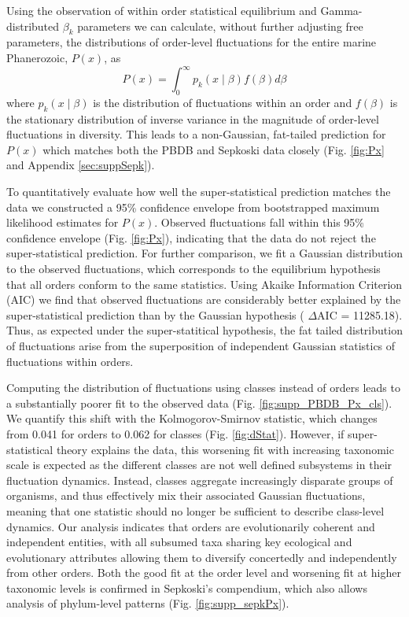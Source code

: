 \documentclass[12pt]{article}
\begin{document}
Using the observation of within order statistical equilibrium and
Gamma-distributed $\beta_k$ parameters we can calculate, without
further adjusting free parameters, the distributions of order-level
fluctuations for the entire marine Phanerozoic, $P(x)$, as
\begin{equation}
  P(x) = \int_0^\infty p_k(x \mid \beta) f(\beta) d\beta \label{eq:PxInt}
\end{equation}
where $p_k(x \mid \beta)$ is the distribution of fluctuations within
an order and $f(\beta)$ is the stationary distribution of inverse
variance in the magnitude of order-level fluctuations in
diversity. This leads to a non-Gaussian, fat-tailed prediction for
$P(x)$ which matches both the PBDB and Sepkoski data closely
(Fig. \ref{fig:Px} and Appendix \ref{sec:suppSepk}).

To quantitatively evaluate how well the super-statistical prediction
matches the data we constructed a 95\% confidence envelope from
bootstrapped maximum likelihood estimates for $P(x)$. Observed
fluctuations fall within this 95\% confidence envelope
(Fig. \ref{fig:Px}), indicating that the data do not reject the
super-statistical prediction. For further comparison, we fit a
Gaussian distribution to the observed fluctuations, which corresponds
to the equilibrium hypothesis that all orders conform to the same
statistics. Using Akaike Information Criterion (AIC) we find that
observed fluctuations are considerably better explained by the
super-statistical prediction than by the Gaussian hypothesis ({\small
  $\Delta$}AIC = 11285.18). Thus, as expected under the
super-statitical hypothesis, the fat tailed distribution of
fluctuations arise from the superposition of independent Gaussian
statistics of fluctuations within orders.

Computing the distribution of fluctuations using classes instead of
orders leads to a substantially poorer fit to the observed data
(Fig. \ref{fig:supp_PBDB_Px_cls}). We quantify this shift with the
Kolmogorov-Smirnov statistic, which changes from 0.041 for orders to
0.062 for classes (Fig. \ref{fig:dStat}). However, if super-statistical
theory explains the data, this worsening fit with increasing taxonomic
scale is expected as the different classes are not well defined
subsystems in their fluctuation dynamics. Instead, classes aggregate
increasingly disparate groups of organisms, and thus effectively mix
their associated Gaussian fluctuations, meaning that one statistic
should no longer be sufficient to describe class-level dynamics. Our
analysis indicates that orders are evolutionarily coherent and
independent entities, with all subsumed taxa sharing key ecological
and evolutionary attributes allowing them to diversify concertedly and
independently from other orders. Both the good fit at the order level
and worsening fit at higher taxonomic levels is confirmed in
Sepkoski's compendium, which also allows analysis of phylum-level
patterns (Fig. \ref{fig:supp_sepkPx}).
\end{document}
